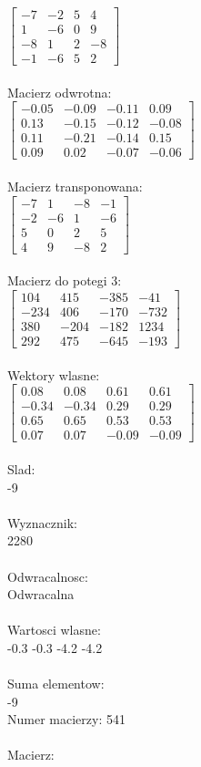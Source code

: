 \documentclass[a4paper,12pt]{article}
\begin{document}
$\begin{bmatrix} -7&-2&5&4\\1&-6&0&9\\-8&1&2&-8\\-1&-6&5&2 \end{bmatrix}$
\\
\\
Macierz odwrotna:\\

$\begin{bmatrix} -0.05&-0.09&-0.11&0.09\\0.13&-0.15&-0.12&-0.08\\0.11&-0.21&-0.14&0.15\\0.09&0.02&-0.07&-0.06 \end{bmatrix}$
\\
\\
Macierz transponowana:\\

$\begin{bmatrix} -7&1&-8&-1\\-2&-6&1&-6\\5&0&2&5\\4&9&-8&2 \end{bmatrix}$
\\
\\
Macierz do potegi 3:\\

$\begin{bmatrix} 104&415&-385&-41\\-234&406&-170&-732\\380&-204&-182&1234\\292&475&-645&-193 \end{bmatrix}$
\\
\\
Wektory wlasne:\\

$\begin{bmatrix} 0.08&0.08&0.61&0.61\\-0.34&-0.34&0.29&0.29\\0.65&0.65&0.53&0.53\\0.07&0.07&-0.09&-0.09 \end{bmatrix}$
\\
\\
Slad:\\
-9
\\
\\
Wyznacznik:\\
2280
\\
\\
Odwracalnosc:\\
Odwracalna
\\
\\
Wartosci wlasne:\\
-0.3 -0.3 -4.2 -4.2
\\
\\
Suma elementow:\\
-9
\\
\newpage
Numer macierzy:
541
\\
\\
Macierz:\\
\end{document}
